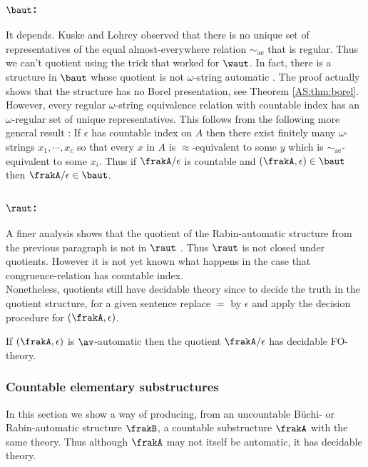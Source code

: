 \subsubsection*{$\baut$:} It depends.
Kuske and Lohrey \cite{KuLo05} observed that there is no unique set of representatives of the equal almost-everywhere relation $\sim_{\textrm{ae}}$ that is regular.
Thus we can't quotient using the trick that worked for $\waut$. In fact, there is a structure in $\baut$ whose quotient is not $\omega$-string 
automatic \cite{HKMN08}. The proof actually shows that the structure has no Borel presentation, see Theorem \ref{AS:thm:borel}.
However, every regular $\omega$-string equivalence relation with countable index has an $\omega$-regular set of unique representatives.
This follows from the following more general result  \cite{BKRu08}:
If $\epsilon$ has countable index on $A$ then there exist finitely many $\omega$-strings $x_1,\cdots,x_c$ 
so that every $x$  in $A$ is $\approx$-equivalent to some $y$ which is $\sim_{\textrm{ae}}$-equivalent to some  $x_i$.  Thus if $\frakA /\epsilon$ is 
countable and $(\frakA,\epsilon) \in \baut$ then $\frakA/\epsilon \in \baut$.

\subsubsection*{$\raut$:} A finer analysis shows that the quotient of the Rabin-automatic structure from the previous paragraph is not in $\raut$ \cite{HKMN08}.
Thus $\raut$ is not closed under quotients. However it is not yet known what happens in the case that congruence-relation has countable index.
~\\

Nonetheless, quotients still have decidable theory since to decide the truth in the quotient structure, for a given sentence replace $=$ by $\epsilon$ and apply the decision procedure for $(\frakA,\epsilon)$.

\begin{proposition} \cite{CoLo07}
If $(\frakA,\epsilon)$ is $\av$-automatic then the quotient $\frakA/\epsilon$ has decidable FO-theory.
\end{proposition}

\subsubsection*{Countable elementary substructures}

In this section we show a way of producing, from an uncountable B\"uchi- or Rabin-automatic structure $\frakB$, a countable substructure $\frakA$
with the same theory. Thus although $\frakA$ may not itself be automatic, it has decidable theory.


